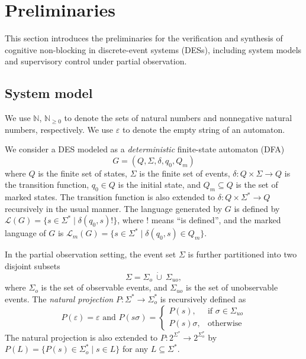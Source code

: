 \documentclass[final,5p,times,twocolumn,authoryear]{elsarticle}
\begin{document}
\section{Preliminaries}\label{sec:prelimi}

This section introduces the preliminaries for the verification and synthesis of cognitive non-blocking in discrete-event systems (DESs), including system models and supervisory control under partial observation.


\subsection{System model}

We use $\mathbb{N}$, $\mathbb{N}_{\geq 0}$ to denote the sets of natural numbers and nonnegative natural numbers, respectively. 
We use $\varepsilon$ to denote the empty string of an automaton. 
%

We consider a DES  modeled as a \emph{deterministic} finite-state automaton (DFA)  
    $$
        G = (Q, \Sigma, \delta, q_0, Q_m)
    $$
    where
    $Q$ is the finite set of states, 
    $\Sigma$ is the finite set of events, 
    $\delta: Q \times \Sigma \to Q$ is the   transition function,
    $q_0\in Q$ is the initial state, 
    and $Q_m\subseteq Q$ is the set of marked states. 
The transition function is also extended to 
$\delta:Q\times \Sigma^* \to Q$ recursively in the usual manner. 
The language generated by $G$ is defined by 
$\mathcal{L}(G) = \{ s \in \Sigma^* \mid \delta(q_0, s)! \}$, where $!$ means ``is defined'', and the marked language of $G$ is 
$\mathcal{L}_m(G) = \{ s \in \Sigma^* \mid \delta(q_0, s) \in Q_m \}$. 

%
In the partial observation setting, the event set $\Sigma$ is further  partitioned into two disjoint subsets 
\[
\Sigma = \Sigma_o \ \dot{\cup} \ \Sigma_{uo},
\]
where $\Sigma_o$ is the set of observable events, and $\Sigma_{uo}$ is the set of unobservable events. 
The \emph{natural projection} $P : \Sigma^* \rightarrow \Sigma_{o}^*$ is recursively defined as
\begin{equation}
P(\varepsilon)  = \varepsilon\text{ and }
P(s \sigma) =
\begin{cases}
P(s), & \text{if } \sigma \in \Sigma_{uo} \\
P(s)\sigma, & \text{otherwise}
\end{cases}
\label{eq:proj}
\end{equation} 
The natural projection is also extended to $P:2^{\Sigma^*}\to 2^{\Sigma_o^*}$ by $P(L)=\{P(s)\in \Sigma_o^* \mid s\in L\}$  for any $L\subseteq\Sigma^*$. 
    
\end{document}
